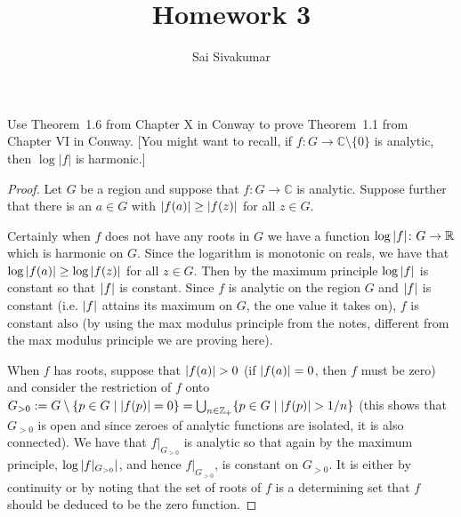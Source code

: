 \documentclass[12pt]{amsart}
\title{Homework 3}
\author{Sai Sivakumar}
\newcommand{\CC}{\mathbb{C}}
\begin{document}
\maketitle
\thispagestyle{empty}
Use Theorem~1.6 from Chapter X  in Conway to prove Theorem~1.1 from Chapter VI  in Conway.
[You might want to recall, if $f:G\to \CC\setminus \{0\}$ is analytic,  then $\log |f|$  is harmonic.]

 \bigskip

\begin{proof}
\baselineskip=24pt
Let $G$ be a region and suppose that $f\colon G\to \mathbb{C}$ is analytic. Suppose further that there is an $a\in G$ with $\abs{f(a)}\geq \abs{f(z)}$ for all $z\in G$.

Certainly when $f$ does not have any roots in $G$ we have a function $\log\abs{f}\colon G\to \mathbb{R}$ which is harmonic on $G$. Since the logarithm is monotonic on reals, we have that $\log\abs{f(a)}\geq \log\abs{f(z)}$ for all $z\in G$. Then by the maximum principle $\log\abs{f}$ is constant so that $\abs{f}$ is constant. Since $f$ is analytic on the region $G$ and $\abs{f}$ is constant (i.e. $\abs{f}$ attains its maximum on $G$, the one value it takes on), $f$ is constant also (by using the max modulus principle from the notes, different from the max modulus principle we are proving here). 

When $f$ has roots, suppose that $\abs{f(a)}>0$ (if $\abs{f(a)} = 0$, then $f$ must be zero) and consider the restriction of $f$ onto $G_{>0} := G\setminus\{p\in G\mid \abs{f(p)} = 0\} = \bigcup_{n\in\mathbb{Z}_+}\{p\in G\mid \abs{f(p)}> 1/n\}$ (this shows that $G_{>0}$ is open and since zeroes of analytic functions are isolated, it is also connected). We have that $f|_{G_{>0}}$ is analytic so that again by the maximum principle, $\log\abs{f|_{G_{>0}}}$, and hence $f|_{G_{>0}}$, is constant on $G_{>0}$. It is either by continuity or by noting that the set of roots of $f$ is a determining set that $f$ should be deduced to be the zero function. 
\end{proof}
\end{document}
